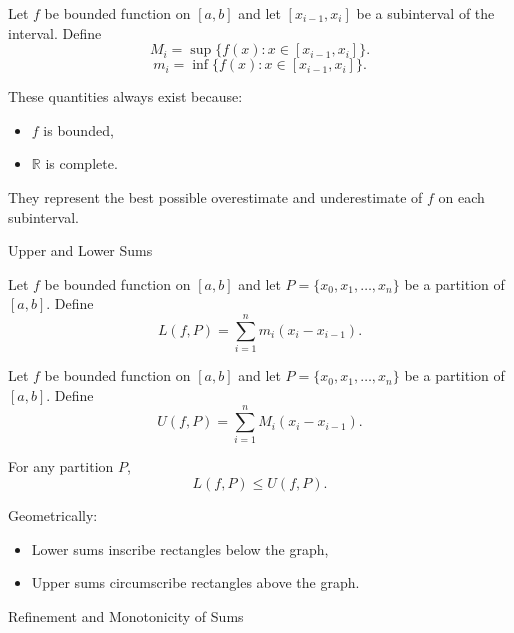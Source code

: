 \documentclass[12pt, a4paper]{article}
\begin{document}
\begin{definition}
Let $f$ be bounded function on $[a,b]$ and let $[x_{i-1},x_i]$ be a subinterval of the interval. Define
\[M_i=\sup\{f(x):x\in[x_{i-1},x_i]\}.\]
\[m_i=\inf\{f(x):x\in[x_{i-1},x_i]\}.\]
\end{definition}

These quantities always exist because:
\begin{itemize}
\item $f$ is bounded,
\item $\mathbb{R}$ is complete.
\end{itemize}

They represent the best possible overestimate and underestimate of $f$ on each subinterval.

\clearpage

\begin{heading}
Upper and Lower Sums
\end{heading}

\begin{definition}
Let $f$ be bounded function on $[a,b]$ and let $P=\{x_0,x_1,\dots,x_n\}$ be a partition of $[a,b]$. Define
\[L(f,P)=\sum_{i=1}^n m_i(x_i-x_{i-1}).\]
\end{definition}

\clearpage

\begin{definition}
Let $f$ be bounded function on $[a,b]$ and let $P=\{x_0,x_1,\dots,x_n\}$ be a partition of $[a,b]$. Define
\[U(f,P)=\sum_{i=1}^n M_i(x_i-x_{i-1}).\]
\end{definition}

\clearpage

\begin{theorem}
For any partition $P$,
\[
L(f,P)\le U(f,P).
\]
\end{theorem}

Geometrically:
\begin{itemize}
\item Lower sums inscribe rectangles below the graph,
\item Upper sums circumscribe rectangles above the graph.
\end{itemize}

\clearpage

\begin{heading}
Refinement and Monotonicity of Sums
\end{heading}
\end{document}
